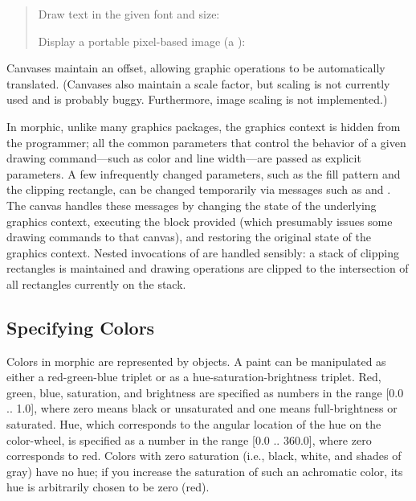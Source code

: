 \documentclass[letterpaper,10pt,english]{sphinxmanual}
\begin{document}
\begin{quote}
Draw text in the given font and size:

\begin{sphinxVerbatim}[commandchars=\\\{\}]
         
\end{sphinxVerbatim}

Display a portable pixel-based image (a ):

\begin{sphinxVerbatim}[commandchars=\\\{\}]
   
\end{sphinxVerbatim}
\end{quote}

Canvases maintain an offset, allowing graphic operations to be automatically translated. (Canvases also maintain a scale factor, but scaling is not currently used and is probably buggy. Furthermore, image scaling is not implemented.)

In morphic, unlike many graphics packages, the graphics context is hidden from the programmer; all the common parameters that control the behavior of a given drawing command—such as color and line width—are passed as explicit parameters. A few infrequently changed parameters, such as the fill pattern and the clipping rectangle, can be changed temporarily via messages such as  and . The canvas handles these messages by changing the state of the underlying graphics context, executing the block provided (which presumably issues some drawing commands to that canvas), and restoring the original state of the graphics context. Nested invocations of  are handled sensibly: a stack of clipping rectangles is maintained and drawing operations are clipped to the intersection of all rectangles currently on the stack.


\subsection{Specifying Colors}
\label{\detokenize{morphic:specifying-colors}}
Colors in morphic are represented by  objects. A paint can be manipulated as either a red-green-blue triplet or as a hue-saturation-brightness triplet. Red, green, blue, saturation, and brightness are specified as numbers in the range {[}0.0 .. 1.0{]}, where zero means black or unsaturated and one means full-brightness or saturated. Hue, which corresponds to the angular location of the hue on the color-wheel, is specified as a number in the range {[}0.0 .. 360.0{]}, where zero corresponds to red. Colors with zero saturation (i.e., black, white, and shades of gray) have no hue; if you increase the saturation of such an achromatic color, its hue is arbitrarily chosen to be zero (red).
\end{document}
